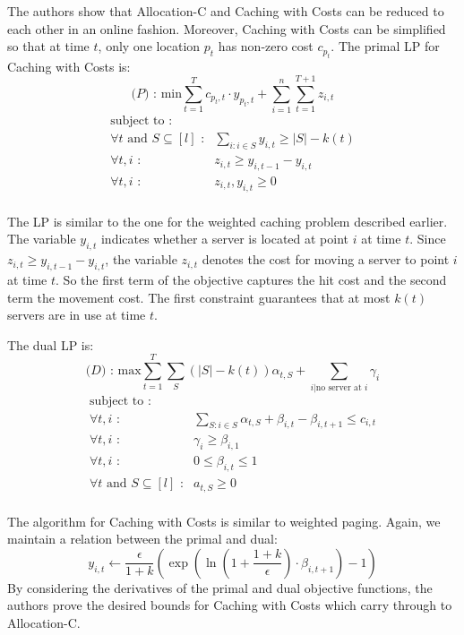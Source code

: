 The authors show that Allocation-C and Caching with Costs can be reduced to each other in an online fashion.
Moreover, Caching with Costs can be simplified so that at time $t$, only one location $p_t$ has non-zero cost $c_{p_t}$.
The primal LP for Caching with Costs is:
\[
\textrm{($P$) : min}  \sum_{t=1}^T c_{p_t, t} \cdot y_{p_t,t} + \sum_{i=1}^n\sum_{t=1}^{T+1} z_{i,t}
\]
\[
	\begin{array}{rr}
	\textrm{subject to :} & \\
		\forall t \textrm{ and } S \subseteq [l] \textrm{ :} & \sum_{i : i \in S} y_{i,t} \geq |S| - k(t) \\
		\forall t,i \textrm{ :} & z_{i,t} \geq y_{i,t-1} - y_{i,t} \\
		\forall t,i \textrm{ :} & z_{i,t}, y_{i,t} \geq 0 \\
	\end{array}
\]


The LP is similar to the one for the weighted caching problem described earlier.
The variable $y_{i,t}$ indicates whether a server is located at point $i$ at time $t$.
Since $z_{i,t} \geq y_{i,t-1} - y_{i,t}$, the variable $z_{i,t}$ denotes the cost for moving a server to point $i$ at time $t$.
So the first term of the objective captures the hit cost and the second term the movement cost.
The first constraint guarantees that at most $k(t)$ servers are in use at time $t$.

The dual LP is:
\[
\textrm{($D$) : max}  \sum_{t=1}^T\sum_S (|S| - k(t)) \alpha_{t,S} + \sum_{i | \textrm{no server at }i} \gamma_i
\]
\[
	\begin{array}{rr}
	\textrm{subject to :} & \\
		\forall t,i \textrm{ :} & \sum_{S: i\in S} \alpha_{t,S} + \beta_{i,t} - \beta_{i,t+1} \leq c_{i,t}\\
		\forall t,i \textrm{ :} & \gamma_i \geq \beta_{i, 1} \\
		\forall t,i \textrm{ :} & 0 \leq \beta_{i, t} \leq 1\\
		\forall t \textrm { and } S \subseteq [l] \textrm{ :} & a_{t,S} \geq 0\\
	\end{array}
\]


The algorithm for Caching with Costs is similar to weighted paging.
Again, we maintain a relation between the primal and dual:
\[
y_{i,t} \leftarrow \frac{\epsilon}{1 + k} \left( \exp\left( \ln\left( 1 + \frac{1+k}{\epsilon} \right) \cdot \beta_{i, t+1} \right) - 1 \right)
\]
By considering the derivatives of the primal and dual objective functions, the authors prove the desired bounds for Caching with Costs which carry through to Allocation-C.
